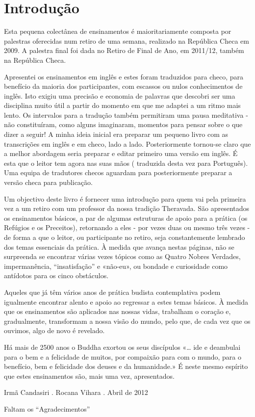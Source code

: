 \chapter{Introdução}

Esta pequena colectânea de ensinamentos é maioritariamente composta por
palestras oferecidas num retiro de uma semana, realizado na República
Checa em 2009. A palestra final foi dada no Retiro de Final de Ano, em
2011/12, também na República Checa.

Apresentei os ensinamentos em inglês e estes foram traduzidos para
checo, para benefício da maioria dos participantes, com escassos ou
nulos conhecimentos de inglês. Isto exigiu uma precisão e economia de
palavras que descobri ser uma disciplina muito útil a partir do momento
em que me adaptei a um ritmo mais lento. Os intervalos para a tradução
também permitiram uma pausa meditativa - não constituíram, como alguns
imaginaram, momentos para pensar sobre o que dizer a seguir! A minha
ideia inicial era preparar um pequeno livro com as transcrições em
inglês e em checo, lado a lado. Posteriormente tornou-se claro que a
melhor abordagem seria preparar e editar primeiro uma versão em inglês.
É esta que o leitor tem agora nas suas mãos ( traduzida desta vez para
Português). Uma equipa de tradutores checos aguardam para posteriormente
preparar a versão checa para publicação.

Um objectivo deste livro é fornecer uma introdução para quem vai pela
primeira vez a um retiro com um professor da nossa tradição Theravada.
São apresentados os ensinamentos básicos, a par de algumas estruturas de
apoio para a prática (os Refúgios e os Preceitos), retornando a eles -
por vezes duas ou mesmo três vezes - de forma a que o leitor, ou
participante no retiro, seja constantemente lembrado dos temas
essenciais da prática. À medida que avança nestas páginas, não se
surpreenda se encontrar várias vezes tópicos como as Quatro Nobres
Verdades, impermanência, ``insatisfação'' e «não-eu», ou bondade e
curiosidade como antídotos para os cinco obstáculos.

Aqueles que já têm vários anos de prática budista contemplativa podem
igualmente encontrar alento e apoio ao regressar a estes temas básicos.
À medida que os ensinamentos são aplicados nas nossas vidas, trabalham o
coração e, gradualmente, transformam a nossa visão do mundo, pelo que,
de cada vez que os ouvimos, algo de novo é revelado.

Há mais de 2500 anos o Buddha exortou os seus discípulos «\ldots{} ide e
deambulai para o bem e a felicidade de muitos, por compaixão para com o
mundo, para o benefício, bem e felicidade dos deuses e da humanidade.» É
neste mesmo espírito que estes ensinamentos são, mais uma vez,
apresentados.

Irmã Candasiri . Rocana Vihara . Abril de 2012


Faltam os ``Agradecimentos''

